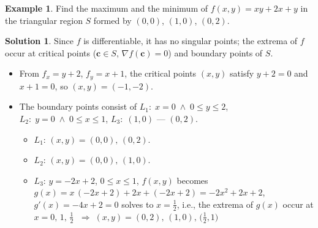 \documentclass[10pt]{extarticle}
\newcommand{\ds}{\displaystyle}
\newcommand{\ie}{\;\Longrightarrow\;}
\newcommand{\andd}{\;\wedge\;}
\theoremstyle{definition}
\newtheorem*{ex}{Example}
\newtheorem*{sol}{Solution}
\newcommand{\vc}{\mathbf{c}}
\begin{document}
\newpage

\begin{ex}
  Find the maximum and the minimum of $\ds f(x, y) = xy + 2x + y$ in the triangular region $S$ formed by $(0, 0)$, $(1, 0)$, $(0, 2)$. 
\end{ex}

\begin{sol}
  Since $f$ is differentiable, it has no singular points; the extrema of $f$ occur at critical points ($\vc\in S,\,\nabla f(\vc) = 0$) and boundary points of $S$. \vspace{-1mm}
  \begin{itemize}\setlength\itemsep{0em}
    \item From $\ds f_x = y + 2$, $\ds f_y = x + 1$, the critical points $(x, y)$ satisfy $\ds y + 2 = 0$ and $\ds x + 1 = 0$, so $(x, y) = (-1, -2)$. 
    \item The boundary points consist of $L_1:\;x = 0\andd 0\leqslant y\leqslant 2$, $L_2:\;y = 0\andd 0\leqslant x\leqslant 1$, $L_3:\;(1, 0)$ --- $(0, 2)$. \vspace{-2mm} 
      \begin{itemize}%
        \item $L_1$: $(x, y) = (0, 0),\,(0, 2)$. 
        \item $L_2$: $(x, y) = (0, 0),\,(1, 0)$. 
        \item $L_3$: $y = -2 x + 2$, $0\leqslant x\leqslant 1$, $f(x, y)$ becomes $g(x) = x\,(-2x + 2) + 2x + (-2x + 2) = -2x^2 + 2x + 2$, $g'(x) = -4x + 2 = 0$ solves to $x = \frac{1}{2}$, i.e., the extrema of $g(x)$ occur at $x = 0,\,1,\,\frac{1}{2}$ $\ie (x, y) = (0, 2),\,(1, 0),\,\big(\frac{1}{2}, 1\big)$ 
      \end{itemize}
  \end{itemize}
  \begin{center}
  \end{center}
\end{sol}
\end{document}
